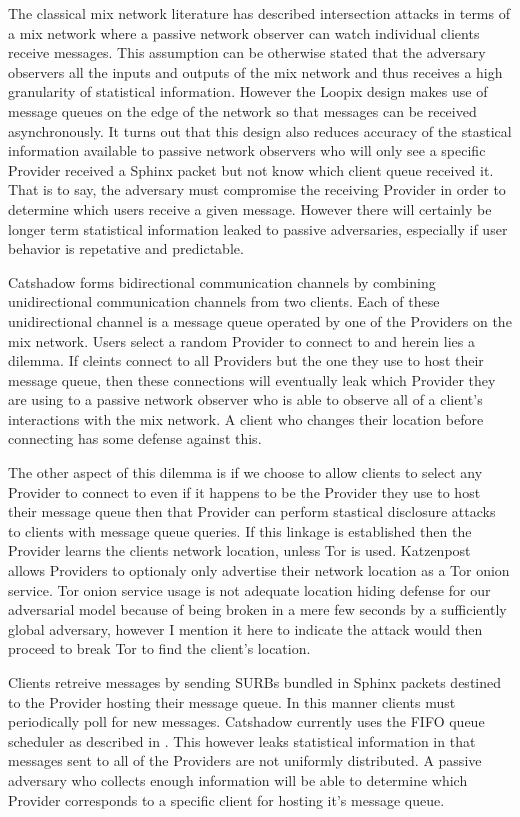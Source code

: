 \documentclass[conference]{IEEEtran}
\begin{document}
The classical mix network literature has described intersection
attacks in terms of a mix network where a passive network observer can
watch individual clients receive messages. This assumption can be
otherwise stated that the adversary observers all the inputs and
outputs of the mix network and thus receives a high granularity of
statistical information. However the Loopix design makes use of
message queues on the edge of the network so that messages can be
received asynchronously.  It turns out that this design also reduces
accuracy of the stastical information available to passive network
observers who will only see a specific Provider received a Sphinx
packet but not know which client queue received it. That is to say,
the adversary must compromise the receiving Provider in order to
determine which users receive a given message. However there will
certainly be longer term statistical information leaked to passive
adversaries, especially if user behavior is repetative and
predictable.

Catshadow forms bidirectional communication channels by combining
unidirectional communication channels from two clients. Each of these
unidirectional channel is a message queue operated by one of the
Providers on the mix network. Users select a random Provider to
connect to and herein lies a dilemma. If cleints connect to all
Providers but the one they use to host their message queue, then these
connections will eventually leak which Provider they are using to a
passive network observer who is able to observe all of a client's
interactions with the mix network. A client who changes their location
before connecting has some defense against this.

The other aspect of this dilemma is if we choose to allow clients to
select any Provider to connect to even if it happens to be the Provider
they use to host their message queue then that Provider can perform
stastical disclosure attacks to clients with message queue queries.
If this linkage is established then the Provider learns the clients
network location, unless Tor is used. Katzenpost allows Providers to
optionaly only advertise their network location as a Tor onion service.
Tor onion service usage is not adequate location hiding defense for our
adversarial model because of being broken in a mere few seconds by a sufficiently
global adversary, however I mention it here to indicate the attack would
then proceed to break Tor to find the client's location.

Clients retreive messages by sending SURBs bundled in Sphinx packets destined
to the Provider hosting their message queue. In this manner clients must
periodically poll for new messages. Catshadow currently uses the FIFO queue
scheduler as described in \cite{piotrowska2017loopix}. This however leaks
statistical information in that messages sent to all of the Providers
are not uniformly distributed. A passive adversary who collects enough
information will be able to determine which Provider corresponds to a
specific client for hosting it's message queue.
\end{document}
